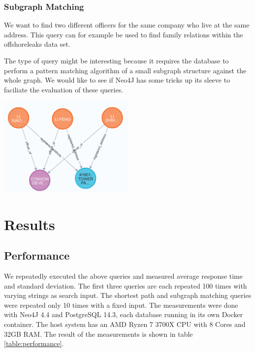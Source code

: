 \documentclass[11pt, a4paper,oneside,chapterprefix=false]{scrbook}
\begin{document}
\subsection{Subgraph Matching}

We want to find two different officers for the same company who live at the same address.
This query can for example be used to find family relations within the offshoreleaks data set.

The type of query might be interesting because it requires the database to perform a pattern matching algorithm of a small subgraph structure against the whole graph.
We would like to see if Neo4J has some tricks up its sleeve to faciliate the evaluation of these queries.

\begin{center}
\includegraphics*[width=0.5\textwidth]{figures/query_relation.png}
\end{center}

\chapter{Results} \label{chp:results}

\section{Performance}

We repeatedly executed the above queries and measured average response time and standard deviation.
The first three queries are each repeated 100 times with varying strings as search input.
The shortest path and subgraph matching queries were repeated only 10 times with a fixed input.
The measurements were done with Neo4J 4.4 and PostgreSQL 14.3, each database running in its own Docker container.
The host system has an AMD Ryzen 7 3700X CPU with 8 Cores and 32GB RAM.
The result of the measurements is shown in table \ref{table:performance}.
\end{document}
